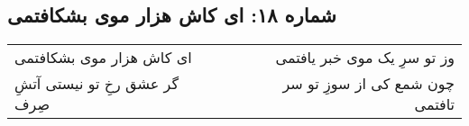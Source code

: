 \begin{center}
\section*{شماره ۱۸: ای کاش هزار موی بشکافتمی}
\label{sec:018}
\begin{longtable}{l p{0.5cm} r}
ای کاش هزار موی بشکافتمی
&&
وز تو سرِ یک موی خبر یافتمی
\\
گر عشق رخِ تو نیستی آتشِ صِرف
&&
چون شمع کی از سوزِ تو سر تافتمی
\\
\end{longtable}
\end{center}
